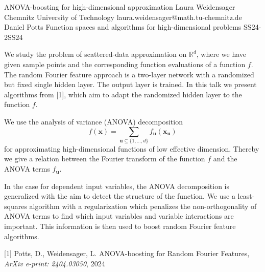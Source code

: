 \begin{talk}
  {ANOVA-boosting for high-dimensional approximation}%
  {Laura Weidensager}%
  {Chemnitz University of Technology}%
  {laura.weidensager@math.tu-chemnitz.de}%
  {Daniel Potts}%
{Function spaces and algorithms for high-dimensional problems}
{}{SS24-2}{SS24}


				
				
We study the problem of scattered-data approximation on $\mathbb{R}^d$, where we have given sample points and the corresponding function evaluations of a function $f$. The random Fourier feature approach is a two-layer network with a randomized but fixed single hidden layer. The output layer is trained. In this talk we present algorithms from [1], which aim to adapt the randomized hidden layer to the function $f$.\par
We use the analysis of variance (ANOVA) decomposition 
$$f(\mathbf{ x}) = \sum_{\mathbf{ u}\subseteq \{1,\ldots, d\}} f_{\mathbf{ u}}(\mathbf{ x}_{\mathbf{\mathbf{ u}}})$$
for approximating high-dimensional functions of low effective dimension. Thereby we give a relation between the Fourier transform of the function $f$ and the ANOVA terms $f_{\mathbf{u}}$. \par
In the case for dependent input variables, the ANOVA decomposition is generalized with the aim to detect the structure of the function. We use a least-squares algorithm with a regularization which penalizes the non-orthogonality of ANOVA terms to find which input variables and variable interactions are important. This information is then used to boost random Fourier feature algorithms. 

\medskip

[1] Potts, D., Weidensager, L. ANOVA-boosting for Random Fourier Features, \textit{ArXiv e-print: 2404.03050}, 2024\\
\end{talk}


